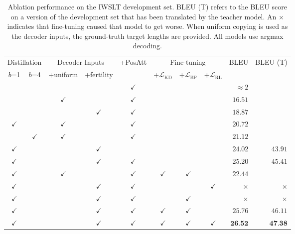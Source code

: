 \begin{table}[h!]
\small\centering
\begin{tabular}{cc|ccc|ccc|rr}
\toprule
\multicolumn{2}{c|}{Distillation}  & 
\multicolumn{2}{c}{Decoder Inputs} & 
\multirow{2}[2]{*}{+PosAtt}  & 
\multicolumn{3}{|c|}{Fine-tuning} & 
\multirow{2}[2]{*}{BLEU} & 
\multirow{2}[2]{*}{BLEU (T)}\\
           
$b$=1 &
$b$=4 &
+uniform & 
\multicolumn{1}{c}{+fertility} 
& 
& 
\multicolumn{1}{|c}{+$\mathcal{L}_\text{KD}$}  & 
+$\mathcal{L}_\text{BP}$ & 
+$\mathcal{L}_\text{RL}$ &   &\\

\midrule 
& &              &              & $\checkmark$  & & & & $\approx 2$ \\
& & $\checkmark$ &              & $\checkmark$  & & & & $16.51$\\
& &              & $\checkmark$ & $\checkmark$  & & & & $18.87$\\
\midrule


$\checkmark$&  & $\checkmark$ &              & $\checkmark$  & & & & $20.72$\\
&  $\checkmark$& $\checkmark$ &              & $\checkmark$  & & & & $21.12$ \\
$\checkmark$&  &              & $\checkmark$ &               & & & & $24.02$ & $43.91$ \\
$\checkmark$&  &              & $\checkmark$ & $\checkmark$  & & & & $25.20$ & $45.41$ \\
\midrule
$\checkmark$&  & $\checkmark$ &  & $\checkmark$& $\checkmark$ & $\checkmark$ & & $22.44$ \\
$\checkmark$&  &              & $\checkmark$ & $\checkmark$  & & & $\checkmark$ & $\times$ & $\times$\\
$\checkmark$&  &              & $\checkmark$ & $\checkmark$  & & $\checkmark$ & & $\times$ & $\times$\\
$\checkmark$&  &              & $\checkmark$ & $\checkmark$  & $\checkmark$ & $\checkmark$ &  & $25.76$ & $46.11$\\
$\checkmark$&  &              & $\checkmark$ & $\checkmark$  & $\checkmark$ & $\checkmark$ & $\checkmark$ & $ \textbf{26.52}$ & $\textbf{47.38}$\\
\bottomrule
\end{tabular}
\caption{Ablation performance on the IWSLT development set. BLEU (T) refers to the BLEU score on a version of the development set that has been translated by the teacher model. An $\times$ indicates that fine-tuning caused that model to get worse. When uniform copying is used as the decoder inputs, the ground-truth target lengths are provided. All models use argmax decoding.}
\end{table}

